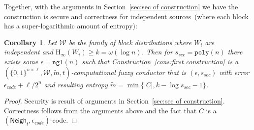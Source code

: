 \documentclass[11pt]{article}
\newcommand{\secref}[1]{\mbox{Section~\ref{#1}}}
\newcommand{\lemref}[1]{\mbox{Lemma~\ref{#1}}}
\newcommand{\consref}[1]{\mbox{Construction~\ref{#1}}}
\DeclareMathOperator*{\expe}{\mathbb{E}}
\newcommand{\class}[1]{{\ensuremath{\mathsf{#1}}}}
\newcommand{\zo}{\ensuremath{\{0, 1\}}}
\newcommand{\neigh}{\ensuremath{\class{Neigh}}\xspace}
\newcommand{\dis}{\ensuremath{\mathsf{dis}}}
\newcommand{\poly}{\ensuremath{\mathtt{poly}}\xspace}
\newcommand{\ngl}{\ensuremath{\mathtt{ngl}}\xspace}
\newcommand{\Hoo}{\mathrm{H}_\infty}
\newtheorem{lemma}[theorem]{Lemma}
\newtheorem{corollary}[theorem]{Corollary}
\newcommand{\authnote}[2]{{\textcolor{red}{\textsf{#1 notes: }\textcolor{blue}{ #2}}\marginpar{\textcolor{red}{\textbf{!!!!!}}}}}
\newcommand{\authnote}[2]{}
\newcommand{\bnote}[1]{{\authnote{Ben}{#1}}}
\begin{document}

Together, with the arguments in \secref{sec:sec of construction} we have the construction is secure and correctness for independent sources~(where each block has a super-logarithmic amount of entropy):
\begin{corollary}
Let $\mathcal{W}$ be the family of block distributions where $W_i$ are independent and $\Hoo(W_i) \geq k= \omega(\log n)$.  Then for $s_{sec} = \poly(n)$ there exists some $\epsilon=\ngl(n)$ such that \consref{cons:first construction} is a $(\zo^{n\times \ell}, \mathcal{W}, \tilde{m}, t)$-computational fuzzy conductor that is $(\epsilon, s_{sec})$ with error $\epsilon_{code} + \ell/2^n$ and resulting entropy $\tilde{m} =\min\{ |C|, k - \log s_{sec} -1\}$.
\end{corollary}
\begin{proof}
Security is result of arguments in \secref{sec:sec of construction}.  Correctness follows from the arguments above and the fact that $C$ is a $(\neigh_t, \epsilon_{code})$-code.
\end{proof}
\end{document}
